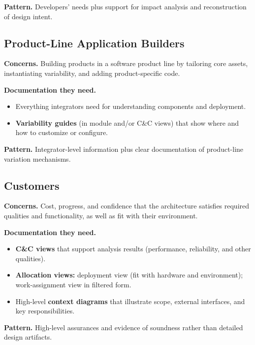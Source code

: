 \documentclass[11pt]{article}
\begin{document}
\noindent
\textbf{Pattern.} Developers' needs plus support for impact analysis and reconstruction of design intent.

\subsection{Product-Line Application Builders}

\textbf{Concerns.} Building products in a software product line by tailoring core assets, instantiating variability, and adding product-specific code.

\medskip
\noindent
\textbf{Documentation they need.}
\begin{itemize}[noitemsep]
  \item Everything integrators need for understanding components and deployment.
  \item \textbf{Variability guides} (in module and/or C\&C views) that show where and how to customize or configure.
\end{itemize}

\noindent
\textbf{Pattern.} Integrator-level information plus clear documentation of product-line variation mechanisms.

\subsection{Customers}

\textbf{Concerns.} Cost, progress, and confidence that the architecture satisfies required qualities and functionality, as well as fit with their environment.

\medskip
\noindent
\textbf{Documentation they need.}
\begin{itemize}[noitemsep]
  \item \textbf{C\&C views} that support analysis results (performance, reliability, and other qualities).
  \item \textbf{Allocation views:} deployment view (fit with hardware and environment); work-assignment view in filtered form.
  \item High-level \textbf{context diagrams} that illustrate scope, external interfaces, and key responsibilities.
\end{itemize}

\noindent
\textbf{Pattern.} High-level assurances and evidence of soundness rather than detailed design artifacts.
\end{document}
